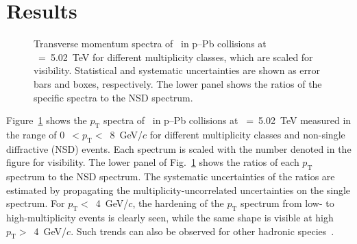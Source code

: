
\section {Results}
\label{sec:results}

\begin{figure}[!hbt]
	\centering
	\caption{ Transverse momentum spectra of \fzero~in p--Pb collisions at \snn~=~5.02~TeV for different multiplicity classes, which are scaled for visibility. Statistical and systematic uncertainties are shown as error bars and boxes, respectively. The lower panel shows the ratios of the specific spectra to the NSD spectrum. }
	\label{fig:pt}
\end{figure}

Figure~\ref{fig:pt} shows the $p_{\mathrm{T}}$ spectra of \fzero~in p--Pb collisions at \snn~=~5.02~TeV measured in the range of 0~$<p_{\mathrm{T}}<$~8~GeV/$c$ for different multiplicity classes and non-single diffractive (NSD) events. Each spectrum is scaled with the number denoted in the figure for visibility. The lower panel of Fig.~\ref{fig:pt} shows the ratios of each $p_{\mathrm{T}}$ spectrum to the NSD spectrum. The systematic uncertainties of the ratios are estimated by propagating the multiplicity-uncorrelated uncertainties on the single spectrum. For $p_{\mathrm{T}}<$~4~GeV/$c$, the hardening of the $p_{\mathrm{T}}$ spectrum from low- to high-multiplicity events is clearly seen, while the same shape is visible at high $p_{\mathrm{T}}>$~4~GeV/$c$. Such trends can also be observed for other hadronic species~\cite{Tsallis:1987eu}.

